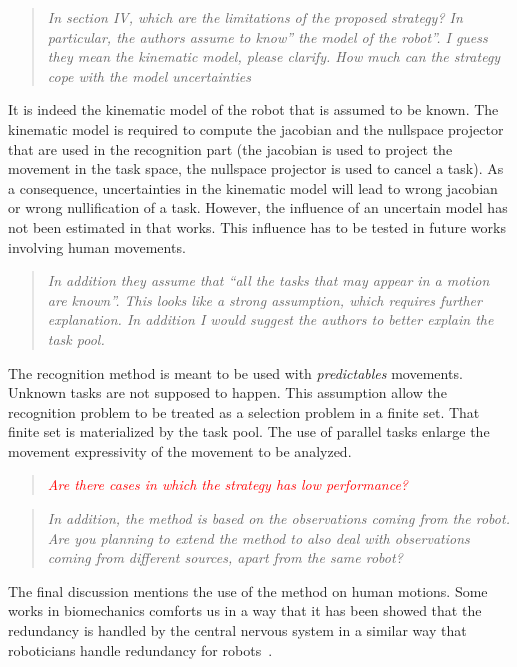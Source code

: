 \documentclass[11pt]{article}
\newcommand{\red}[1]{{\textcolor{red}{#1}}}
\begin{document}
\begin{quote}
\textit{
  In section IV, which are the limitations of the proposed strategy? In particular, the authors assume to know” the model of the robot”.  I guess they mean the kinematic model, please clarify. How much can the strategy cope with the model uncertainties
}
\end{quote}
It is indeed the kinematic model of the robot that is assumed to be known. The kinematic model is
required to compute the jacobian and the nullspace projector that are used in the recognition part
(the jacobian is used to project the movement in the task space, the nullspace projector is used
 to cancel a task).
As a consequence, uncertainties in the kinematic model will lead to wrong jacobian or wrong
nullification of a task. However, the influence
of an uncertain model has not been estimated in that works. 
This influence has to be tested in future works involving human movements.

\begin{quote}
\textit{
 In addition they assume that “all the tasks that may appear in a motion are known”.  This looks like a strong assumption, which requires further explanation.
  In addition I would suggest the authors to better explain the task pool.
}
\end{quote}
The recognition method is meant to be used with \emph{predictables} movements.
Unknown tasks are not supposed to happen. This assumption allow the 
recognition problem to be treated as a selection problem in a finite
set.
That finite set is materialized by the task pool.
The use of parallel tasks enlarge the movement expressivity of the movement to be analyzed.

\begin{quote}
\textit{
 \red{Are there cases in which the strategy has low performance?}
}
 \end{quote}

\begin{quote}
\textit{
  In addition, the method is based on the observations coming from the robot.  Are you planning to extend the method to also deal with observations coming from different sources, apart from the same robot? 
}
\end{quote}
The final discussion mentions the use of the method on human motions.
Some works in biomechanics comforts us in a way that it has been showed
that the redundancy is handled by the central nervous system in a similar 
way that roboticians handle redundancy for robots~\cite{jacquierbret09}.
\end{document}
